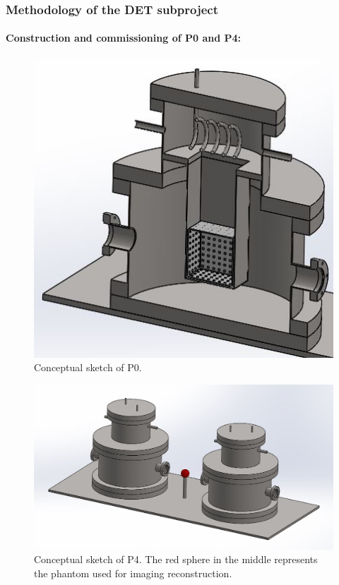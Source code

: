 \subsubsection*{Methodology of the DET subproject}

\paragraph{Construction and commissioning of P0 and P4:}

\begin{figure}[!htb]
	\centering
	\includegraphics[scale=0.4]{img/P0.png}
	\caption{\label{fig.P0} Conceptual sketch of P0.  }
\end{figure}

\begin{figure}[!htb]
	\centering
	\includegraphics[scale=0.4]{img/P2.JPG}
	\caption{\label{fig.P2} Conceptual sketch of P4. The red sphere in the middle represents the phantom used for imaging reconstruction.}
\end{figure}

